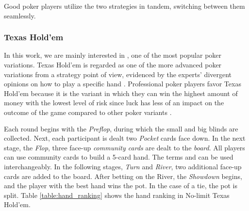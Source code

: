 Good poker players utilize the two strategies in tandem, switching between them seamlessly.


\subsubsection{Texas Hold'em}

In this work, we are mainly interested in , one of the most popular poker variations. Texas Hold'em is regarded as one of the more advanced poker variations from a strategy point of view, evidenced by the experts' divergent opinions on how to play a specific hand \cite{sklansky_2003}. Professional poker players favor Texas Hold'em because it is the variant in which they can win the highest amount of money with the lowest level of risk since luck has less of an impact on the outcome of the game compared to other poker variants \cite{malmuth_2004}.

Each round begins with the \textit{Preflop}, during which the small and big blinds are collected. Next, each participant is dealt two \textit{Pocket} cards face down. In the next stage, the \textit{Flop}, three face-up \textit{community cards} are dealt to the \textit{board}. All players can use community cards to build a 5-card hand. The terms  and  can be used interchangeably. In the following stages, \textit{Turn} and \textit{River}, two additional face-up cards are added to the board. After betting on the River, the \textit{Showdown} begins, and the player with the best hand wins the pot. In the case of a tie, the pot is split. Table \ref{table:hand_ranking} shows the hand ranking in No-limit Texas Hold'em.

